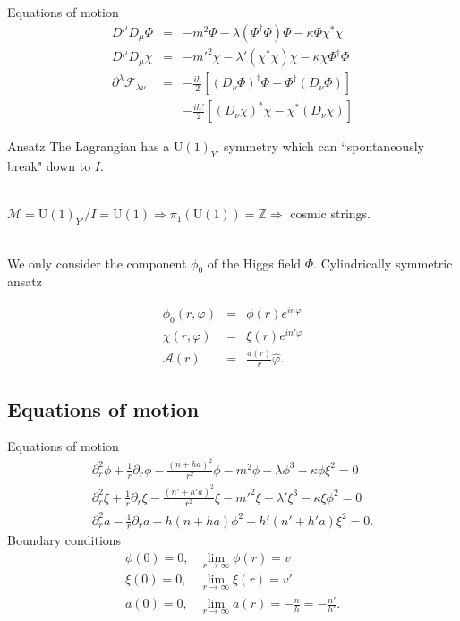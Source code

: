 \documentclass[14pt]{beamer}
\begin{document}
\begin{frame}{Equations of motion}
\begin{eqnarray*}
	D^{\mu}D_{\mu} \Phi & = & -m^2 \Phi - \lambda (\Phi^{\dagger}\Phi)\Phi - \kappa \Phi \chi^* \chi \\
	D^{\mu}D_{\mu} \chi & = & -m'^2 \chi - \lambda' (\chi^{*}\chi)\chi - \kappa \chi \Phi^{\dagger} \Phi \\
	\partial^{\lambda}\mathcal{F}_{\lambda\nu}  & = & -\frac{ih}{2}\left[ (D_{\nu}\Phi)^{\dagger}\Phi-\Phi^{\dagger}(D_{\nu}\Phi)\right] \\
	& & - \frac{ih'}{2}\left[ (D_{\nu}\chi)^{*}\chi-\chi^{*}(D_{\nu}\chi)\right]
\end{eqnarray*}
\end{frame}

\begin{frame}{Ansatz}
The Lagrangian has a U$(1)_{Y'}$ symmetry which can ``spontaneously break" down to $I$. \\~\

$\mathcal{M} = \text{U}(1)_{Y'}/I=\text{U}(1) \Rightarrow \pi_1(\text{U}(1)) = \mathbb{Z} \Rightarrow$ cosmic strings. \\~\

We only consider the component $\phi_0$ of the Higgs field $\Phi$. Cylindrically symmetric ansatz

\begin{eqnarray*}
	\phi_0(r,\varphi) & = & \phi(r) e^{in\varphi} \\
	\chi(r,\varphi) & = & \xi(r) e^{in'\varphi} \\
	\mathbf{\mathcal{A}}(r) & = & \frac{a(r)}{r} \hat{\varphi}.
\end{eqnarray*}

\end{frame}
\subsection{Equations of motion}
\begin{frame}{Equations of motion}
\begin{eqnarray*}
\partial_r^2 \phi + \frac{1}{r} \partial_r \phi- \frac{\left(n+ha\right)^2}{r^2}\phi- m^2 \phi- \lambda \phi^3-\kappa \phi \xi^2 = 0 \\
\partial_r^2 \xi + \frac{1}{r} \partial_r \xi - \frac{\left(n'+h'a\right)^2}{r^2}\xi -m'^2\xi - \lambda' \xi^3 -\kappa \xi \phi^2 = 0\\
\partial_r^2a -\frac{1}{r}\partial_r a-h(n+ha)\phi^2-h'(n' + h'a )\xi^2 = 0.
\end{eqnarray*}
Boundary conditions
\begin{eqnarray*}
	\phi(0)=0, & \displaystyle\lim_{r\to\infty}\phi(r) = v \\
	 \xi(0)=0, &  \displaystyle\lim_{r\to\infty}\xi(r) = v' \\
	 a(0)=0, & \displaystyle \lim_{r\to\infty}a(r) = -\frac{n}{h}=-\frac{n'}{h'} .
\end{eqnarray*}

\end{frame}
\end{document}
